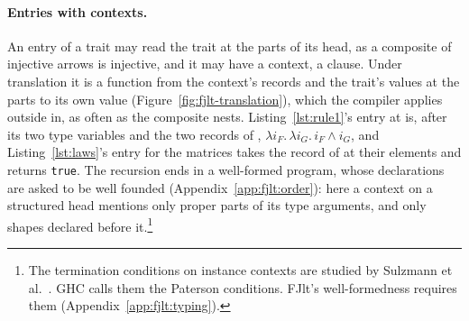 \paragraph{Entries with contexts.}
\label{sec:translation:contexts}
An entry of a trait may read the trait at the parts of its head, as a composite of injective arrows is injective, and it may have a context, a  clause.
Under translation it is a function from the context's records and the trait's values at the parts to its own value (Figure~\ref{fig:fjlt-translation}), which the compiler applies outside in, as often as the composite nests.
Listing~\ref{lst:rule1}'s entry at  is, after its two type variables and the two records of , $\lambda i_F.\,\lambda i_G.\,i_F \wedge i_G$, and Listing~\ref{lst:laws}'s entry for the matrices takes the record of  at their elements and returns \texttt{true}.
The recursion ends in a well-formed program, whose declarations are asked to be well founded (Appendix~\ref{app:fjlt:order}): here a context on a structured head mentions only proper parts of its type arguments, and only shapes declared before it.\footnote{The termination conditions on instance contexts are studied by Sulzmann et al.~\cite{sulzmann2007understanding}.
GHC calls them the Paterson conditions.
FJlt's well-formedness requires them (Appendix~\ref{app:fjlt:typing}).}


